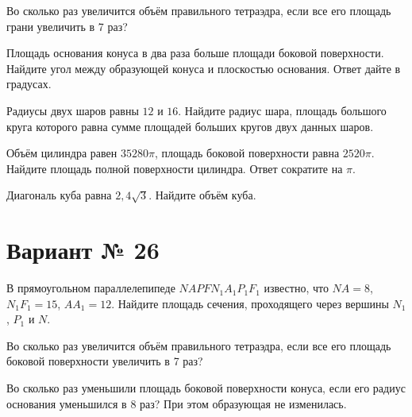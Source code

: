 \documentclass[4apaper]{article}
\begin{document}
\begin{taskBN}{2}
Во сколько раз увеличится объём правильного тетраэдра, если все его площадь грани увеличить в 7 раз?
\end{taskBN}

\begin{taskBN}{3}
Площадь основания конуса в два раза больше площади боковой поверхности. Найдите угол между образующей конуса и плоскостью основания. Ответ дайте в градусах.
\end{taskBN}

\begin{taskBN}{4}
Радиусы двух шаров равны $12$ и $16$. Найдите радиус шара, площадь большого круга которого равна сумме площадей больших кругов двух данных шаров.
\end{taskBN}

\begin{taskBN}{5}
Объём цилиндра равен $35280\pi$, площадь боковой поверхности равна $2520\pi$. Найдите площадь полной поверхности цилиндра. Ответ сократите на $\pi$.
\end{taskBN}

\begin{taskBN}{6}
Диагональ куба равна $2,4\sqrt{3}$. Найдите объём куба.
\end{taskBN}
\newpage\section*{Вариант № 26}

\begin{taskBN}{1}
В прямоугольном параллелепипеде  $NAPFN_{1}A_{1}P_{1}F_{1}$  известно, что  $NA = 8$, $N_{1}F_{1} = 15$, $AA_{1} = 12$. Найдите площадь сечения, проходящего через вершины $N_{1}$, $P_{1}$ и $N$.
\end{taskBN}

\begin{taskBN}{2}
Во сколько раз увеличится объём правильного тетраэдра, если все его площадь боковой поверхности увеличить в 7 раз?
\end{taskBN}

\begin{taskBN}{3}
Во сколько раз уменьшили площадь боковой поверхности конуса, если его радиус основания уменьшился в 8 раз? При этом образующая не изменилась.
\end{taskBN}
\end{document}
